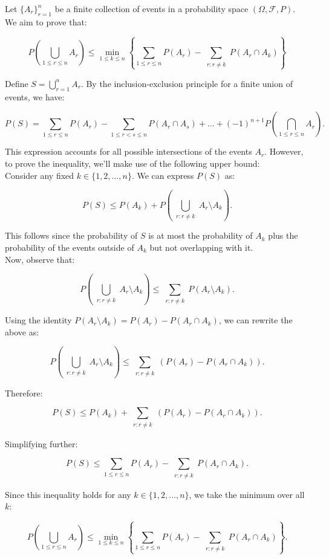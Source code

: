 \begin{exercise}
    Let $\{A_r\}_{r=1}^n$ be a finite collection of events in a probability space $(\Omega, \mathcal{F}, P)$. We aim to prove that:

\[
P\left(\bigcup_{1 \leq r \leq n} A_r\right) \leq \min_{1 \leq k \leq n} \left\{ \sum_{1 \leq r \leq n} P(A_r) - \sum_{\substack{r: r \neq k}} P(A_r \cap A_k) \right\}
\]
\end{exercise}

\begin{solution}
    Define $S = \bigcup_{r=1}^{n} A_r$. By the inclusion-exclusion principle for a finite union of events, we have:

    \[
    P(S) = \sum_{1 \leq r \leq n} P(A_r) - \sum_{1 \leq r < s \leq n} P(A_r \cap A_s) + \ldots + (-1)^{n+1} P\left(\bigcap_{1 \leq r \leq n} A_r\right).
    \]
    
    This expression accounts for all possible intersections of the events $A_r$. However, to prove the inequality, we'll make use of the following upper bound:\\
    
    Consider any fixed $k \in \{1, 2, \ldots, n\}$. We can express $P(S)$ as:
    
    \[
    P(S) \leq P(A_k) + P\left(\bigcup_{\substack{r: r \neq k}} A_r \setminus A_k\right).
    \]
    
    This follows since the probability of $S$ is at most the probability of $A_k$ plus the probability of the events outside of $A_k$ but not overlapping with it.\\
    
    Now, observe that:
    
    \[
    P\left(\bigcup_{\substack{r: r \neq k}} A_r \setminus A_k\right) \leq \sum_{\substack{r: r \neq k}} P(A_r \setminus A_k).
    \]
    
    Using the identity $P(A_r \setminus A_k) = P(A_r) - P(A_r \cap A_k)$, we can rewrite the above as:
    
    \[
    P\left(\bigcup_{\substack{r: r \neq k}} A_r \setminus A_k\right) \leq \sum_{\substack{r: r \neq k}} \left(P(A_r) - P(A_r \cap A_k)\right).
    \]
    
    Therefore:
    
    \[
    P(S) \leq P(A_k) + \sum_{\substack{r: r \neq k}} \left(P(A_r) - P(A_r \cap A_k)\right).
    \]
    
    Simplifying further:
    
    \[
    P(S) \leq \sum_{1 \leq r \leq n} P(A_r) - \sum_{\substack{r: r \neq k}} P(A_r \cap A_k).
    \]
    
    Since this inequality holds for any $k \in \{1, 2, \ldots, n\}$, we take the minimum over all $k$:
    
    \[
    P\left(\bigcup_{1 \leq r \leq n} A_r\right) \leq \min_{1 \leq k \leq n} \left\{ \sum_{1 \leq r \leq n} P(A_r) - \sum_{\substack{r: r \neq k}} P(A_r \cap A_k) \right\}.
    \]
\end{solution}

